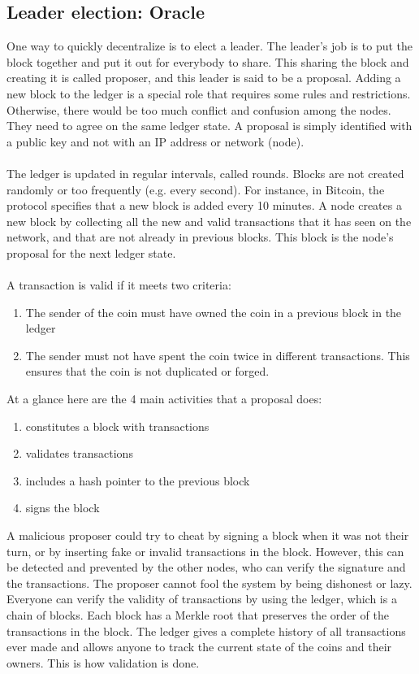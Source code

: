 \subsection{Leader election: Oracle}
One way to quickly decentralize is to elect a leader. The leader's job is to put the block together and put it out for everybody to share. This sharing the block and creating it is called proposer, and this leader is said to be a proposal. Adding a new block to the ledger is a special role that requires some rules and restrictions. Otherwise, there would be too much conflict and confusion among the nodes. They need to agree on the same ledger state. A proposal is simply identified with a public key and not with an IP address or network (node).\\\\
The ledger is updated in regular intervals, called rounds. Blocks are not created randomly or too frequently (e.g. every second). For instance, in Bitcoin, the protocol specifies that a new block is added every 10 minutes. A node creates a new block by collecting all the new and valid transactions that it has seen on the network, and that are not already in previous blocks. This block is the node’s proposal for the next ledger state.\\\\
A transaction is valid if it meets two criteria:
\begin{enumerate}
    \item The sender of the coin must have owned the coin in a previous block in the ledger
    \item The sender must not have spent the coin twice in different transactions. This ensures that the coin is not duplicated or forged.
\end{enumerate}
At a glance here are the 4 main activities that a proposal does:
\begin{enumerate}
    \item constitutes a block with transactions
    \item validates transactions
    \item includes a hash pointer to the previous block
    \item signs the block
\end{enumerate}
A malicious proposer could try to cheat by signing a block when it was not their turn, or by inserting fake or invalid transactions in the block. However, this can be detected and prevented by the other nodes, who can verify the signature and the transactions. The proposer cannot fool the system by being dishonest or lazy. Everyone can verify the validity of transactions by using the ledger, which is a chain of blocks. Each block has a Merkle root that preserves the order of the transactions in the block. The ledger gives a complete history of all transactions ever made and allows anyone to track the current state of the coins and their owners. This is how validation is done.\\\\
